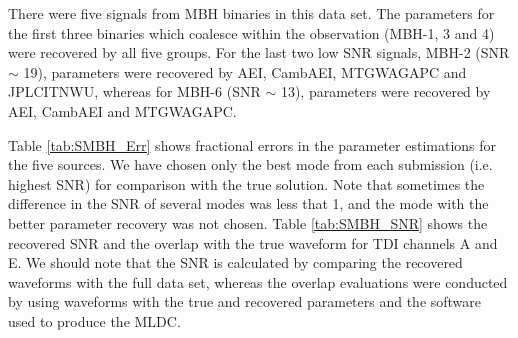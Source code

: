 \documentclass{iopart}
\begin{document}
There were five signals from MBH binaries in this data set. The parameters for the first three binaries which coalesce within the observation (MBH-1, 3 and 4) were recovered by all five groups. For the last two low SNR signals, MBH-2 (SNR $\sim$ 19), parameters were recovered by AEI, CambAEI, MTGWAGAPC and JPLCITNWU, whereas for MBH-6 (SNR $\sim$ 13), parameters were recovered by AEI, CambAEI and MTGWAGAPC.  

Table \ref{tab:SMBH_Err} shows fractional errors in the parameter estimations for the five sources. We have chosen only the best mode from each submission (i.e. highest SNR) for comparison with the true solution. Note that 
sometimes the difference in the SNR of several modes was less that 1, and the mode with the better 
parameter recovery was not chosen.
Table \ref{tab:SMBH_SNR} shows the recovered SNR and the overlap with  the true waveform for TDI channels A and E. We should note that the SNR is calculated by comparing the recovered waveforms with the full data set, whereas the overlap evaluations were conducted by using waveforms with the true and recovered parameters and the software
used to produce the MLDC.
\end{document}
